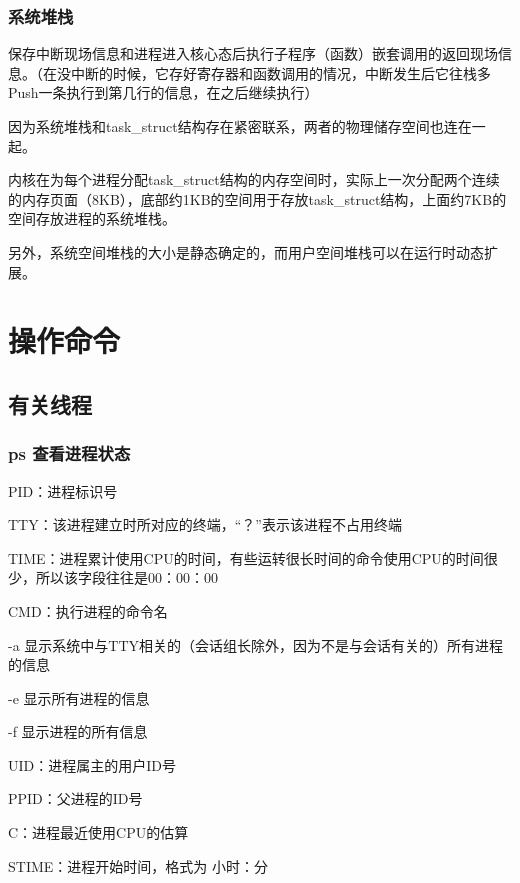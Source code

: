 \documentclass{ctexart}
\begin{document}

\subsubsection{系统堆栈}
保存中断现场信息和进程进入核心态后执行子程序（函数）嵌套调用的返回现场信息。（在没中断的时候，它存好寄存器和函数调用的情况，中断发生后它往栈多Push一条执行到第几行的信息，在之后继续执行）

因为系统堆栈和task\_struct结构存在紧密联系，两者的物理储存空间也连在一起。

内核在为每个进程分配task\_struct结构的内存空间时，实际上一次分配两个连续的内存页面（8KB），底部约1KB的空间用于存放task\_struct结构，上面约7KB的空间存放进程的系统堆栈。

另外，系统空间堆栈的大小是静态确定的，而用户空间堆栈可以在运行时动态扩展。

\section{操作命令}
\subsection{有关线程}
\subsubsection{ps 查看进程状态}
PID：进程标识号

TTY：该进程建立时所对应的终端，“？”表示该进程不占用终端

TIME：进程累计使用CPU的时间，有些运转很长时间的命令使用CPU的时间很少，所以该字段往往是00：00：00

CMD：执行进程的命令名

\vspace{\baselineskip}

-a 显示系统中与TTY相关的（会话组长除外，因为不是与会话有关的）所有进程的信息

-e 显示所有进程的信息

-f 显示进程的所有信息

UID：进程属主的用户ID号

PPID：父进程的ID号

C：进程最近使用CPU的估算

STIME：进程开始时间，格式为 小时：分
\end{document}

